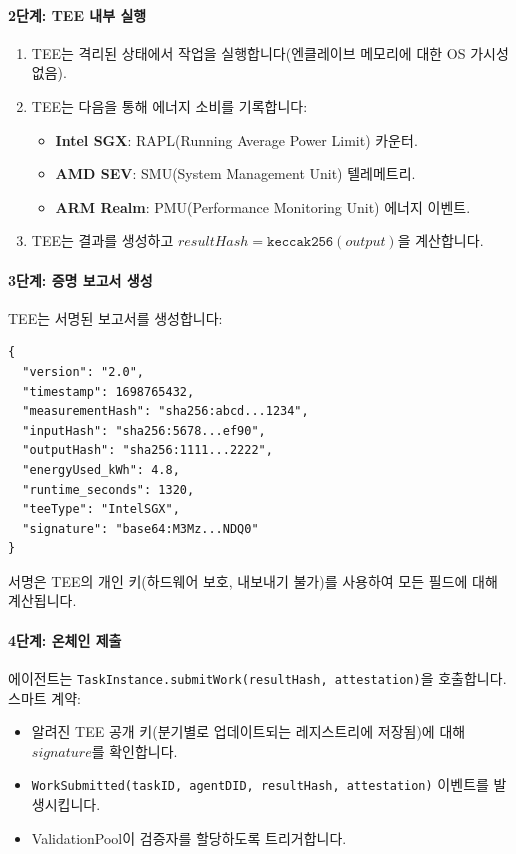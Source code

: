 \documentclass[11pt]{article}
\begin{document}
\paragraph{2단계: TEE 내부 실행}
\begin{enumerate}[noitemsep]
  \item TEE는 격리된 상태에서 작업을 실행합니다(엔클레이브 메모리에 대한 OS 가시성 없음).
  \item TEE는 다음을 통해 에너지 소비를 기록합니다:
    \begin{itemize}[noitemsep]
      \item \textbf{Intel SGX}: RAPL(Running Average Power Limit) 카운터.
      \item \textbf{AMD SEV}: SMU(System Management Unit) 텔레메트리.
      \item \textbf{ARM Realm}: PMU(Performance Monitoring Unit) 에너지 이벤트.
    \end{itemize}
  \item TEE는 결과를 생성하고 $resultHash = \texttt{keccak256}(output)$을 계산합니다.
\end{enumerate}

\paragraph{3단계: 증명 보고서 생성}
TEE는 서명된 보고서를 생성합니다:
\begin{verbatim}
{
  "version": "2.0",
  "timestamp": 1698765432,
  "measurementHash": "sha256:abcd...1234",
  "inputHash": "sha256:5678...ef90",
  "outputHash": "sha256:1111...2222",
  "energyUsed_kWh": 4.8,
  "runtime_seconds": 1320,
  "teeType": "IntelSGX",
  "signature": "base64:M3Mz...NDQ0"
}
\end{verbatim}
서명은 TEE의 개인 키(하드웨어 보호, 내보내기 불가)를 사용하여 모든 필드에 대해 계산됩니다.

\paragraph{4단계: 온체인 제출}
에이전트는 \texttt{TaskInstance.submitWork(resultHash, attestation)}을 호출합니다. 스마트 계약:
\begin{itemize}[noitemsep]
  \item 알려진 TEE 공개 키(분기별로 업데이트되는 레지스트리에 저장됨)에 대해 $signature$를 확인합니다.
  \item \texttt{WorkSubmitted(taskID, agentDID, resultHash, attestation)} 이벤트를 발생시킵니다.
  \item ValidationPool이 검증자를 할당하도록 트리거합니다.
\end{itemize}
\end{document}
